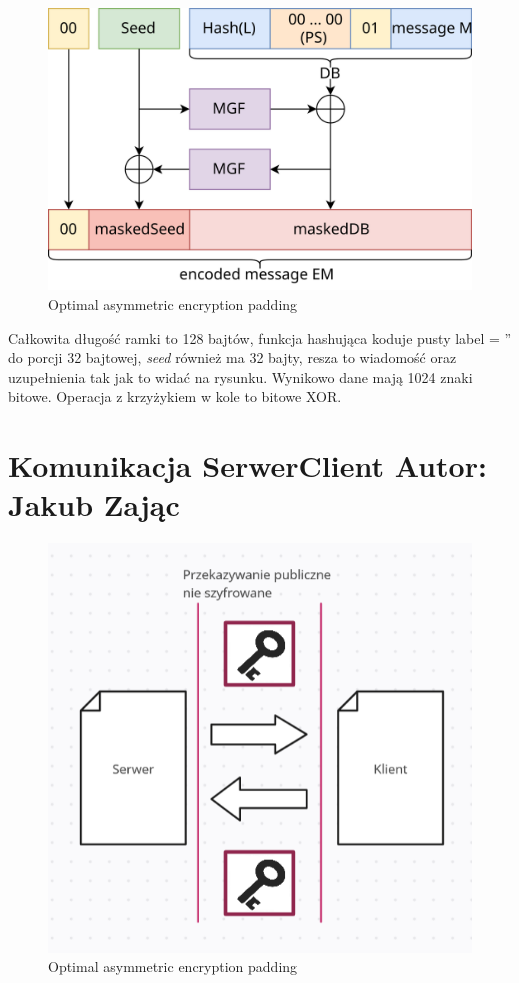\documentclass[a4paper,12pt]{article}
\begin{document}
\begin{figure}
\centerline{\includegraphics[scale=0.2]{OAEP.png}}
\caption{Optimal asymmetric encryption padding}
\end{figure}
Całkowita długość ramki to 128 bajtów, funkcja hashująca koduje pusty label = '' do porcji 32 bajtowej, \textit{seed} również ma 32 bajty, resza to wiadomość oraz uzupełnienia tak jak to widać na rysunku. Wynikowo dane mają 1024 znaki bitowe. Operacja z krzyżykiem w kole to bitowe XOR.


\section{Komunikacja SerwerClient \color{red} Autor: Jakub Zając }

\begin{figure}
\centerline{\includegraphics[scale=0.6]{KeyExchange.png}}
\caption{Optimal asymmetric encryption padding}
\end{figure}
\end{document}
